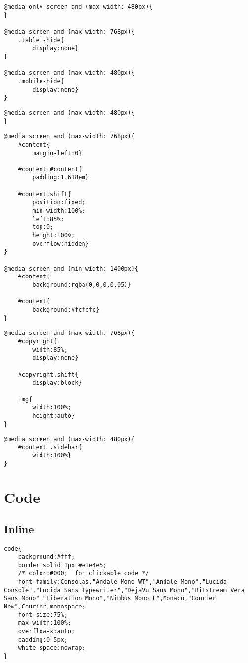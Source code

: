 \documentclass[11pt]{article}
\begin{document}
\begin{verbatim}
@media only screen and (max-width: 480px){
}

@media screen and (max-width: 768px){
    .tablet-hide{
        display:none}
}

@media screen and (max-width: 480px){
    .mobile-hide{
        display:none}
}
\end{verbatim}

\begin{verbatim}
@media screen and (max-width: 480px){
}
\end{verbatim}

\begin{verbatim}
@media screen and (max-width: 768px){
    #content{
        margin-left:0}

    #content #content{
        padding:1.618em}

    #content.shift{
        position:fixed;
        min-width:100%;
        left:85%;
        top:0;
        height:100%;
        overflow:hidden}
}

@media screen and (min-width: 1400px){
    #content{
        background:rgba(0,0,0,0.05)}

    #content{
        background:#fcfcfc}
}
\end{verbatim}

\begin{verbatim}
@media screen and (max-width: 768px){
    #copyright{
        width:85%;
        display:none}

    #copyright.shift{
        display:block}

    img{
        width:100%;
        height:auto}
}
\end{verbatim}

\begin{verbatim}
@media screen and (max-width: 480px){
    #content .sidebar{
        width:100%}
}
\end{verbatim}

\section{Code}
\label{sec:org4e7dfc1}
\subsection{Inline}
\label{sec:orgf833ef0}

\begin{verbatim}
code{
    background:#fff;
    border:solid 1px #e1e4e5;
    /* color:#000;  for clickable code */
    font-family:Consolas,"Andale Mono WT","Andale Mono","Lucida Console","Lucida Sans Typewriter","DejaVu Sans Mono","Bitstream Vera Sans Mono","Liberation Mono","Nimbus Mono L",Monaco,"Courier New",Courier,monospace;
    font-size:75%;
    max-width:100%;
    overflow-x:auto;
    padding:0 5px;
    white-space:nowrap;
}
\end{verbatim}
\end{document}
